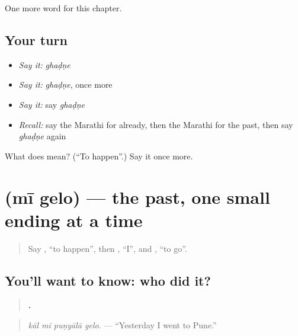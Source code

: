 \begin{grammarlens}[title={What you've built}]
One more word for this chapter.
\end{grammarlens}

\subsection*{Your turn}
\begin{itemize}
\raggedright
  \item \emph{Say it:} \emph{ghaḍṇe}
  \item \emph{Say it:} \emph{ghaḍṇe}, once more
  \item \emph{Say it:} say \emph{ghaḍṇe}
  \item \emph{Recall:} say the Marathi for already, then the Marathi for the past, then say \emph{ghaḍṇe} again
\end{itemize}

\begin{tcolorbox}[breakable,colback=teal!4,colframe=teal!35!black,title={Before you move on}]
What does  mean? (\textquotedblleft{}To happen\textquotedblright{}.) Say it once more.
\end{tcolorbox}
\section[\texorpdfstring{\mr{मी} \mr{गेलो} (mī gelo)}{मी गेलो (mī gelo)}]{  (mī gelo) — the past, one small ending at a time}

\label{lesson:MR-C159-gelo}



\begin{quote}
Say \textbf{}, \textquotedblleft{}to happen\textquotedblright{}, then \textbf{}, \textquotedblleft{}I\textquotedblright{}, and \textbf{}, \textquotedblleft{}to go\textquotedblright{}.
\end{quote}

\subsection*{You'll want to know: who did it?}
\begin{quote}
\textbf{   .}
\end{quote}

\begin{quote}
\emph{kāl mī puṇyālā gelo.} — \textquotedblleft{}Yesterday I went to Pune.\textquotedblright{}
\end{quote}


